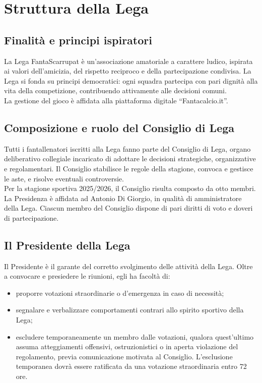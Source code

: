 \chapter{Struttura della Lega}
\label{cap:struttura-lega}

\section{Finalità e principi ispiratori}
\label{art:1.1}

La Lega FantaScarrupat è un'associazione amatoriale a carattere ludico, ispirata ai valori dell'amicizia, del rispetto reciproco e della partecipazione condivisa. La Lega si fonda su principi democratici: ogni squadra partecipa con pari dignità alla vita della competizione, contribuendo attivamente alle decisioni comuni.\\
La gestione del gioco è affidata alla piattaforma digitale “Fantacalcio.it”.

\section{Composizione e ruolo del Consiglio di Lega}
\label{art:1.2}

Tutti i fantallenatori iscritti alla Lega fanno parte del Consiglio di Lega, organo deliberativo collegiale incaricato di adottare le decisioni strategiche, organizzative e regolamentari. Il Consiglio stabilisce le regole della stagione, convoca e gestisce le aste, e risolve eventuali controversie.\\

Per la stagione sportiva 2025/2026, il Consiglio risulta composto da otto membri. La Presidenza è affidata ad Antonio Di Giorgio, in qualità di amministratore della Lega. Ciascun membro del Consiglio dispone di pari diritti di voto e doveri di partecipazione.

\section{Il Presidente della Lega}
\label{art:1.3}

Il Presidente è il garante del corretto svolgimento delle attività della Lega. Oltre a convocare e presiedere le riunioni, egli ha facoltà di:
\begin{itemize}
\item proporre votazioni straordinarie o d'emergenza in caso di necessità;
\item segnalare e verbalizzare comportamenti contrari allo spirito sportivo della Lega;
\item escludere temporaneamente un membro dalle votazioni, qualora quest'ultimo assuma atteggiamenti offensivi, ostruzionistici o in aperta violazione del regolamento, previa comunicazione motivata al Consiglio. L'esclusione temporanea dovrà essere ratificata da una votazione straordinaria entro 72 ore.
\end{itemize}


